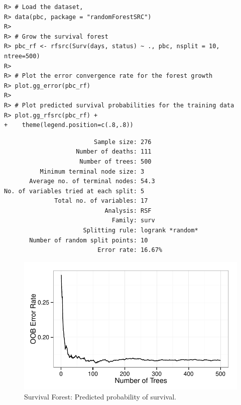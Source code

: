\documentclass[nojss,letterpaper]{jss}\usepackage[]{graphicx}\usepackage[]{color}
\makeatletter
\def\maxwidth{ %
  \ifdim\Gin@nat@width>\linewidth
    \linewidth
  \else
    \Gin@nat@width
  \fi
}
\newenvironment{kframe}{%
 \def\at@end@of@kframe{}%
 \ifinner\ifhmode%
  \def\at@end@of@kframe{\end{minipage}}%
  \begin{minipage}{\columnwidth}%
 \fi\fi%
 \def\FrameCommand##1{\hskip\@totalleftmargin \hskip-\fboxsep
 \colorbox{shadecolor}{##1}\hskip-\fboxsep
     \hskip-\linewidth \hskip-\@totalleftmargin \hskip\columnwidth}%
 \MakeFramed {\advance\hsize-\width
   \@totalleftmargin\z@ \linewidth\hsize
   \@setminipage}}%
 {\par\unskip\endMakeFramed%
 \at@end@of@kframe}
\newenvironment{knitrout}{}{} %
\makeatother
\begin{document}
\begin{knitrout}\footnotesize
{}\color{fgcolor}\begin{kframe}
\begin{verbatim}
R> # Load the dataset,
R> data(pbc, package = "randomForestSRC")
R> 
R> # Grow the survival forest
R> pbc_rf <- rfsrc(Surv(days, status) ~ ., pbc, nsplit = 10, ntree=500)
R> 
R> # Plot the error convergence rate for the forest growth
R> plot.gg_error(pbc_rf)
R> 
R> # Plot predicted survival probabilities for the training data
R> plot.gg_rfsrc(pbc_rf) +
+    theme(legend.position=c(.8,.8))
\end{verbatim}
\end{kframe}
\end{knitrout}


\begin{knitrout}\footnotesize
{}\color{fgcolor}\begin{kframe}
\begin{verbatim}
                         Sample size: 276
                    Number of deaths: 111
                     Number of trees: 500
          Minimum terminal node size: 3
       Average no. of terminal nodes: 54.3
No. of variables tried at each split: 5
              Total no. of variables: 17
                            Analysis: RSF
                              Family: surv
                      Splitting rule: logrank *random*
       Number of random split points: 10
                          Error rate: 16.67%
\end{verbatim}
\end{kframe}\begin{figure}[!htpb]

{\centering \includegraphics[width=\maxwidth]{figure/vig-surv-rf-error-1} 

}

\caption[Survival Forest]{Survival Forest: Predicted probability of survival.\label{fig:surv-rf-error}}
\end{figure}


\end{knitrout}
\end{document}
